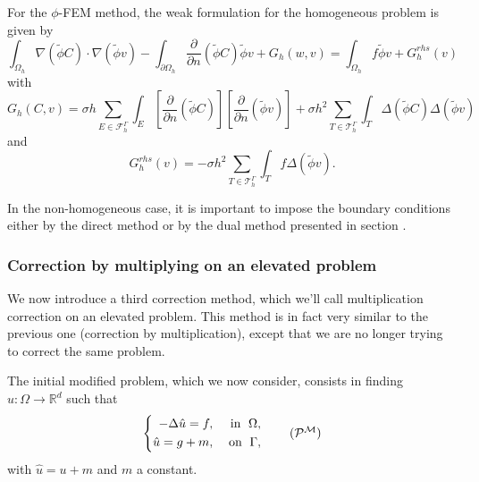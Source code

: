 For the $\phi$-FEM method, the weak formulation for the homogeneous problem is given by
\begin{equation*}
	\int_{\Omega_h} \nabla (\tilde{\phi} C) \cdot \nabla (\tilde{\phi} v) - \int_{\partial\Omega_h} \frac{\partial}{\partial n}(\tilde{\phi} C)\tilde{\phi} v+G_h(w,v)=\int_{\Omega_h} f \tilde{\phi} v + G_h^{rhs}(v)
\end{equation*}
with
\begin{equation*}
	G_h(C,v)=\sigma h\sum_{E\in\mathcal{F}_h^\Gamma} \int_E \left[\frac{\partial}{\partial n}(\tilde{\phi} C)\right] \left[\frac{\partial}{\partial n}(\tilde{\phi} v)\right]+\sigma h^2\sum_{T\in\mathcal{T}_h^\Gamma} \int_{T} \Delta(\tilde{\phi} C)\Delta(\tilde{\phi} v)
\end{equation*}
and
\begin{equation*}
	G_h^{rhs}(v)=-\sigma h^2\sum_{T\in\mathcal{T}_h^\Gamma} \int_{T} f \Delta(\tilde{\phi} v).
\end{equation*}

In the non-homogeneous case, it is important to impose the boundary conditions either by the direct method or by the dual method presented in section . 

\subsubsection{Correction by multiplying on an elevated problem} \label{Corr.method.mult_reh}

We now introduce a third correction method, which we'll call multiplication correction on an elevated problem. This method is in fact very similar to the previous one (correction by multiplication), except that we are no longer trying to correct the same problem.

The initial modified problem, which we now consider, consists in finding $u : \Omega \rightarrow \mathbb{R}^d$ such that
\begin{equation}
	\label{eq.corr.pb_reh}
	\left\{
	\begin{aligned}
		-\Delta \hat{u} = f, \; &&\text{in } \; \Omega, \\
		\hat{u}=g+m, \; &&\text{on } \; \Gamma,
	\end{aligned}
	\right. \tag{$\mathcal{P}^\mathcal{M}$}
\end{equation}
with $\hat{u}=u+m$ and $m$ a constant.


